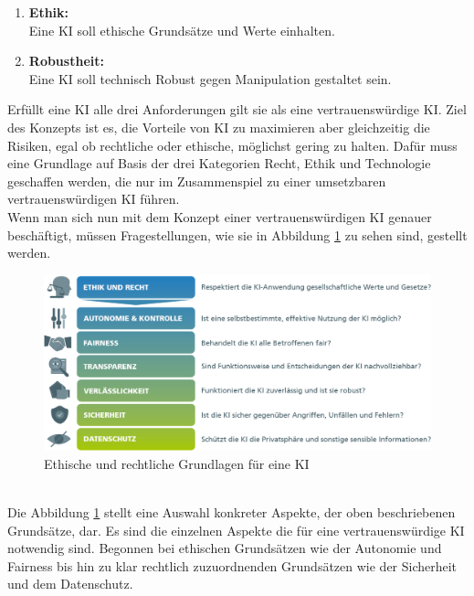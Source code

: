 \begin{onehalfspace}
\begin{enumerate}
            \item \textbf{Ethik:} \\ Eine \ac*{KI} soll ethische Grundsätze und Werte einhalten.
            \item \textbf{Robustheit:} \\ Eine \ac*{KI} soll technisch Robust gegen Manipulation gestaltet sein.
        \end{enumerate}
        Erfüllt eine \ac*{KI} alle drei Anforderungen gilt sie als eine vertrauenswürdige \ac*{KI}. Ziel des Konzepts ist es, die Vorteile von \ac*{KI} zu maximieren aber gleichzeitig die Risiken, egal ob rechtliche oder ethische, möglichst gering zu halten.\cite{HEGKI2019} Dafür muss eine Grundlage auf Basis der drei Kategorien Recht, Ethik und Technologie geschaffen werden, die nur im Zusammenspiel zu einer umsetzbaren vertrauenswürdigen \ac*{KI} führen.
        \\
        Wenn man sich nun mit dem Konzept einer vertrauenswürdigen \ac*{KI} genauer beschäftigt, müssen Fragestellungen, wie sie in Abbildung \ref*{fig:EthikAnforderungen} zu sehen sind, gestellt werden. 
        \\
        \begin{figure}[h]
            \centering
            \includegraphics[width = 14cm]{Bilder/Grafik-KI_Whitepaper_final_WEB_2.png}
            \caption{Ethische und rechtliche Grundlagen für eine \ac*{KI} \cite{Cremers2019}}
            \label{fig:EthikAnforderungen}
        \end{figure}
        \\
        Die Abbildung \ref*{fig:EthikAnforderungen} stellt eine Auswahl konkreter Aspekte, der oben beschriebenen Grundsätze, dar. Es sind die einzelnen Aspekte die für eine vertrauenswürdige \ac*{KI} notwendig sind. Begonnen bei ethischen Grundsätzen wie der Autonomie und Fairness bis hin zu klar rechtlich zuzuordnenden Grundsätzen wie der Sicherheit und dem Datenschutz.\cite{Cremers2019}

\end{onehalfspace}
